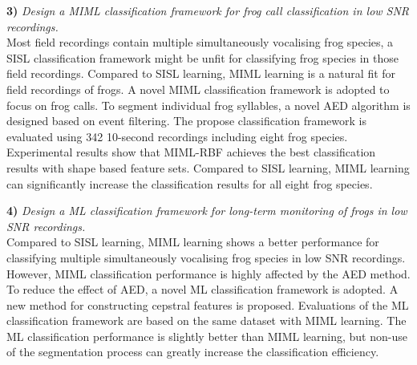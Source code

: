 \textbf{3)}  \textit{Design a MIML classification framework for frog call classification in low SNR recordings.} 
\\
Most field recordings contain multiple simultaneously vocalising frog species,
a SISL classification framework might be unfit for classifying frog species in those field recordings. Compared to SISL learning, MIML learning is a natural fit for field recordings of frogs. A novel MIML classification framework is adopted to focus on frog calls. To segment individual frog syllables, a novel AED algorithm is designed based on event filtering. The propose classification framework is evaluated using 342 10-second recordings including eight frog species. Experimental results show that MIML-RBF achieves the best classification results with shape based feature sets. Compared to SISL learning, MIML learning can significantly increase the classification results for all eight frog species.

\textbf{4)}  \textit{Design a ML classification framework for long-term monitoring of frogs in low SNR recordings.} 
\\ 
Compared to SISL learning, MIML learning shows a better performance for classifying multiple simultaneously vocalising frog species in low SNR recordings.
However, MIML classification performance is highly affected by the AED method.
To reduce the effect of AED, a novel ML classification framework is adopted.
A new method for constructing cepstral features is proposed. Evaluations of the ML classification framework are based on the same dataset with MIML learning. The ML classification performance is slightly better than MIML learning, but non-use of the segmentation process can greatly increase the classification efficiency.




